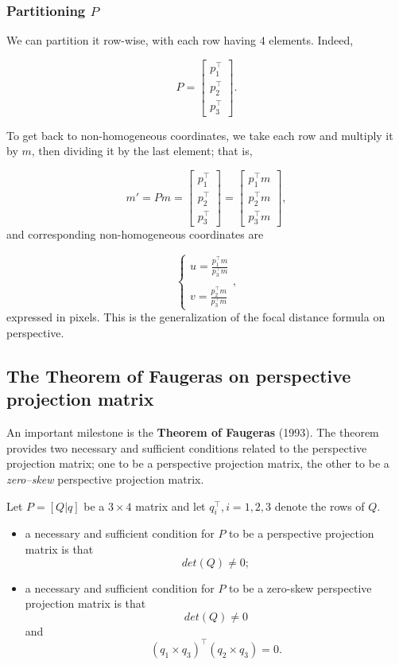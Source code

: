 \documentclass[10pt]{report}
\begin{document}
\subsubsection{Partitioning \(P\)}
\label{sec:org729a46b}
We can partition it row-wise, with each row having \(4\) elements.
Indeed,

\[P = \begin{bmatrix} p_1^\top \\ p_2^\top \\ p_3^\top \end{bmatrix}.\]

To get back to non-homogeneous coordinates, we take each row and
multiply it by \(m\), then dividing it by the last element; that is,

\[m' = Pm = \begin{bmatrix} p_1^\top \\ p_2^\top \\ p_3^\top \end{bmatrix} = \begin{bmatrix} p_1^\top m \\ p_2^\top m \\ p_3^\top m\end{bmatrix},\]
and corresponding non-homogeneous coordinates are

\[\left\{\begin{array}{l} \displaystyle u = \frac{p_1^\top m}{p_3^\top m} \\ \\ \displaystyle v = \frac{p_2^\top m}{p_3^\top m} \end{array}\right.,\]
expressed in pixels. This is the generalization of the focal distance
formula on perspective.

\subsection{The Theorem of Faugeras on perspective projection matrix}
\label{sec:orgeef6153}

An important milestone is the \textbf{Theorem of Faugeras} (1993). The theorem provides two necessary and sufficient conditions related to the perspective projection matrix; one to be a perspective projection matrix, the other to be a \emph{zero--skew} perspective projection matrix.

Let \(P = [Q | q]\) be a \(3 \times 4\) matrix and let
\(q_i^\top, i= 1, 2, 3\) denote the rows of \(Q\).

\begin{itemize}
\item a necessary and sufficient condition for \(P\) to be a perspective
projection matrix is that \[det(Q) \neq 0;\]
\item a necessary and sufficient condition for \(P\) to be a zero-skew
perspective projection matrix is that \[det(Q) \neq 0\] and
\[(q_1 \times q_3)^\top (q_2 \times q_3) = 0.\]
\end{itemize}
\end{document}
